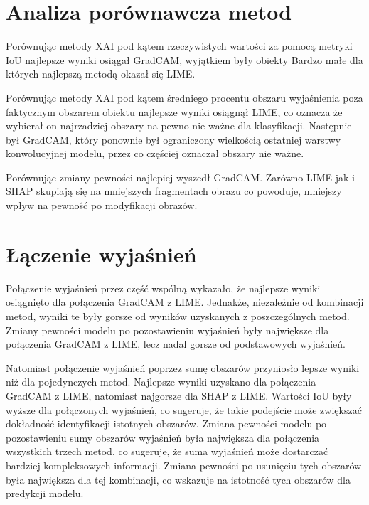 \section*{Analiza porównawcza metod}

Porównując metody XAI pod kątem rzeczywistych wartości za pomocą metryki IoU najlepsze wyniki osiągał GradCAM, wyjątkiem były obiekty Bardzo małe dla których najlepszą metodą okazał się LIME.

Porównując metody XAI pod kątem średniego procentu obszaru wyjaśnienia poza faktycznym obszarem obiektu najlepsze wyniki osiągnął LIME, co oznacza że wybierał on najrzadziej obszary na pewno nie ważne dla klasyfikacji.
Następnie był GradCAM, który ponownie był ograniczony wielkością ostatniej warstwy konwolucyjnej modelu, przez co częściej oznaczał obszary nie ważne.

Porównując zmiany pewności najlepiej wyszedł GradCAM.
Zarówno LIME jak i SHAP skupiają się na mniejszych fragmentach obrazu co powoduje, mniejszy wpływ na pewność po modyfikacji obrazów.

\section*{Łączenie wyjaśnień}

Połączenie wyjaśnień przez część wspólną wykazało, że najlepsze wyniki osiągnięto dla połączenia GradCAM z LIME.
Jednakże, niezależnie od kombinacji metod, wyniki te były gorsze od wyników uzyskanych z poszczególnych metod.
Zmiany pewności modelu po pozostawieniu wyjaśnień były największe dla połączenia GradCAM z LIME, lecz nadal gorsze od podstawowych wyjaśnień.

Natomiast połączenie wyjaśnień poprzez sumę obszarów przyniosło lepsze wyniki niż dla pojedynczych metod.
Najlepsze wyniki uzyskano dla połączenia GradCAM z LIME, natomiast najgorsze dla SHAP z LIME.
Wartości IoU były wyższe dla połączonych wyjaśnień, co sugeruje, że takie podejście może zwiększać dokładność identyfikacji istotnych obszarów.
Zmiana pewności modelu po pozostawieniu sumy obszarów wyjaśnień była największa dla połączenia wszystkich trzech metod, co sugeruje, że suma wyjaśnień może dostarczać bardziej kompleksowych informacji.
Zmiana pewności po usunięciu tych obszarów była największa dla tej kombinacji, co wskazuje na istotność tych obszarów dla predykcji modelu.

